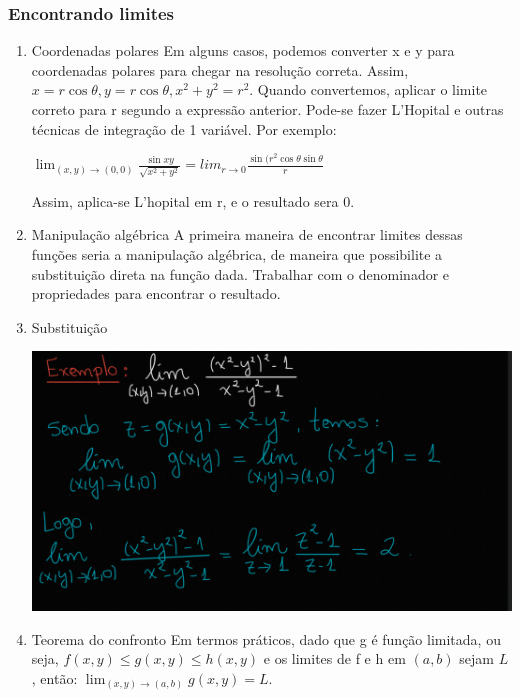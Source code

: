 \documentclass[letterpaper, 11pt]{article}
\begin{document}
\subsubsection{Encontrando limites}
\label{sec:org33323ef}
\begin{enumerate}
\item Coordenadas polares
\label{sec:orge8545e2}
Em alguns casos, podemos converter x e y para coordenadas polares para chegar na resolução correta. Assim, \(x = r \cos\theta, y= r\cos\theta, x^2 + y^2 = r^2\). Quando convertemos, aplicar o limite
correto para r segundo a expressão anterior. Pode-se fazer L'Hopital e outras técnicas de integração de 1 variável. Por exemplo:

\begin{center} $\lim_{(x,y) \to (0,0)} \frac{\sin xy}{\sqrt{x^2+y^2}} = lim_{r \to 0} \frac{\sin(r^2 \cos\theta \sin\theta}{r}$ \end{center}

Assim, aplica-se L'hopital em r, e o resultado sera 0.
\item Manipulação algébrica
\label{sec:orgaff3030}
A primeira maneira de encontrar limites dessas funções seria a manipulação algébrica, de maneira que possibilite a substituição direta na função dada. Trabalhar com o denominador e
propriedades para encontrar o resultado.

\item Substituição
\label{sec:org8b7cf55}
\begin{center}
\includegraphics[width=.9\linewidth]{./img/limsubst.png}
\end{center}
\item Teorema do confronto
\label{sec:org4aebcf7}
Em termos práticos, dado que g é função limitada, ou seja, \(f(x,y) \le g(x,y) \le h(x,y)\) e os limites de f e h em \((a,b)\) sejam \(L\), então: \(\lim_{(x,y) \to (a,b)} g(x,y) = L\).


\end{enumerate}
\end{document}
